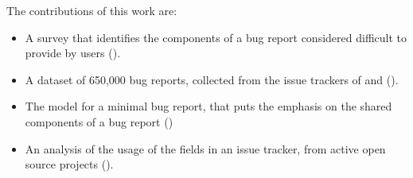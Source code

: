 The contributions of this work are:

\begin{itemize}[$\circ$]

\item A survey that identifies the components of a bug report considered difficult to provide by users ().

\item A dataset of 650,000 bug reports, collected from the issue trackers of \bzilla and \jira ().

\item The model for a minimal bug report, that puts the emphasis on the shared components of a bug report ()

\item An analysis of the usage of the fields in an issue tracker, from active open source projects ().

\end{itemize}




